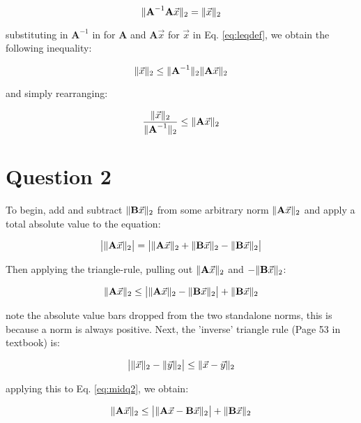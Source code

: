 \documentclass{article}
\begin{document}
\begin{equation}
    \| \textbf{A}^{-1}\textbf{A}\Vec{x} \|_2 = \| \Vec{x} \|_2
\end{equation}

substituting in $\textbf{A}^{-1}$ in for $\textbf{A}$ and $\textbf{A}\Vec{x}$ for $\Vec{x}$ in Eq. \ref{eq:leqdef}, we obtain the following inequality:

\begin{equation}
    \| \Vec{x} \|_2 \leq \| \textbf{A}^{-1} \|_2\| \textbf{A}\Vec{x} \|_2
\end{equation}

and simply rearranging:

\begin{equation}
    \frac{\| \Vec{x} \|_2}{\| \textbf{A}^{-1} \|_2} \leq \| \textbf{A}\Vec{x} \|_2
    \label{eq:ansq1}
\end{equation}

\newpage
\section*{Question 2}

To begin, add and subtract $\| \textbf{B}\Vec{x} \|_2$ from some arbitrary norm $\| \textbf{A}\Vec{x} \|_2$ and apply a total absolute value to the equation:

\begin{equation}
    \bigl| \| \textbf{A}\Vec{x} \|_2 \bigr| = \bigl| \| \textbf{A}\Vec{x} \|_2 + \| \textbf{B}\Vec{x} \|_2 - \| \textbf{B}\Vec{x} \|_2 \bigr|
\end{equation}

Then applying the triangle-rule, pulling out $\| \textbf{A}\Vec{x} \|_2$ and $-\| \textbf{B}\Vec{x} \|_2$:

\begin{equation}
    \| \textbf{A}\Vec{x} \|_2 \leq \bigl| \| \textbf{A}\Vec{x} \|_2-\| \textbf{B}\Vec{x} \|_2 \bigr| + \| \textbf{B}\Vec{x} \|_2
    \label{eq:midq2}
\end{equation}

note the absolute value bars dropped from the two standalone norms, this is because a norm is always positive. Next, the 'inverse' triangle rule (Page 53 in textbook) is:

\begin{equation}
    \bigl| \| \Vec{x} \|_2 - \| \Vec{y} \|_2 \bigr| \leq \| \Vec{x} - \Vec{y} \|_2
\end{equation}

applying this to Eq. \ref{eq:midq2}, we obtain:

\begin{equation}
    \| \textbf{A}\Vec{x} \|_2 \leq \bigl| \| \textbf{A}\Vec{x}-\textbf{B}\Vec{x} \|_2 \bigr| + \| \textbf{B}\Vec{x} \|_2
\end{equation}
\end{document}
